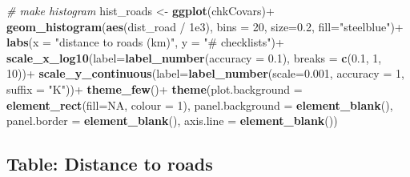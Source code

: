 \documentclass[]{article}
\newenvironment{Shaded}{}{}
\newcommand{\CommentTok}[1]{\textcolor[rgb]{0.38,0.63,0.69}{\textit{#1}}}
\newcommand{\DataTypeTok}[1]{\textcolor[rgb]{0.56,0.13,0.00}{#1}}
\newcommand{\DecValTok}[1]{\textcolor[rgb]{0.25,0.63,0.44}{#1}}
\newcommand{\FloatTok}[1]{\textcolor[rgb]{0.25,0.63,0.44}{#1}}
\newcommand{\KeywordTok}[1]{\textcolor[rgb]{0.00,0.44,0.13}{\textbf{#1}}}
\newcommand{\NormalTok}[1]{#1}
\newcommand{\OperatorTok}[1]{\textcolor[rgb]{0.40,0.40,0.40}{#1}}
\newcommand{\OtherTok}[1]{\textcolor[rgb]{0.00,0.44,0.13}{#1}}
\newcommand{\StringTok}[1]{\textcolor[rgb]{0.25,0.44,0.63}{#1}}
\begin{document}
\begin{Shaded}
\begin{Highlighting}[]

\CommentTok{# make histogram}
\NormalTok{hist_roads <-}\StringTok{ }\KeywordTok{ggplot}\NormalTok{(chkCovars)}\OperatorTok{+}
\StringTok{  }\KeywordTok{geom_histogram}\NormalTok{(}\KeywordTok{aes}\NormalTok{(dist_road }\OperatorTok{/}\StringTok{ }\FloatTok{1e3}\NormalTok{),}
                 \DataTypeTok{bins =} \DecValTok{20}\NormalTok{, }\DataTypeTok{size=}\FloatTok{0.2}\NormalTok{, }\DataTypeTok{fill=}\StringTok{"steelblue"}\NormalTok{)}\OperatorTok{+}
\StringTok{  }\KeywordTok{labs}\NormalTok{(}\DataTypeTok{x =} \StringTok{"distance to roads (km)"}\NormalTok{, }\DataTypeTok{y =} \StringTok{"# checklists"}\NormalTok{)}\OperatorTok{+}
\StringTok{  }\KeywordTok{scale_x_log10}\NormalTok{(}\DataTypeTok{label=}\KeywordTok{label_number}\NormalTok{(}\DataTypeTok{accuracy =} \FloatTok{0.1}\NormalTok{), }
                \DataTypeTok{breaks =} \KeywordTok{c}\NormalTok{(}\FloatTok{0.1}\NormalTok{, }\DecValTok{1}\NormalTok{, }\DecValTok{10}\NormalTok{))}\OperatorTok{+}
\StringTok{  }\KeywordTok{scale_y_continuous}\NormalTok{(}\DataTypeTok{label=}\KeywordTok{label_number}\NormalTok{(}\DataTypeTok{scale=}\FloatTok{0.001}\NormalTok{, }\DataTypeTok{accuracy =} \DecValTok{1}\NormalTok{, }\DataTypeTok{suffix =} \StringTok{"K"}\NormalTok{))}\OperatorTok{+}
\StringTok{  }\KeywordTok{theme_few}\NormalTok{()}\OperatorTok{+}
\StringTok{  }\KeywordTok{theme}\NormalTok{(}\DataTypeTok{plot.background =} \KeywordTok{element_rect}\NormalTok{(}\DataTypeTok{fill=}\OtherTok{NA}\NormalTok{, }\DataTypeTok{colour =} \DecValTok{1}\NormalTok{),}
        \DataTypeTok{panel.background =} \KeywordTok{element_blank}\NormalTok{(),}
        \DataTypeTok{panel.border =} \KeywordTok{element_blank}\NormalTok{(), }\DataTypeTok{axis.line =} \KeywordTok{element_blank}\NormalTok{())}
\end{Highlighting}
\end{Shaded}

\hypertarget{table-distance-to-roads}{%
\subsection{Table: Distance to roads}\label{table-distance-to-roads}}
\end{document}
